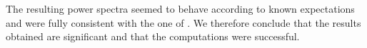 \documentclass[twocolumn]{aastex62}
\begin{document}
The resulting power spectra seemed to behave according to known expectations and were fully consistent with the one of \cite{callin:2006}. We therefore conclude that the results obtained are significant and that the computations were successful.
\newpage


\end{document}

